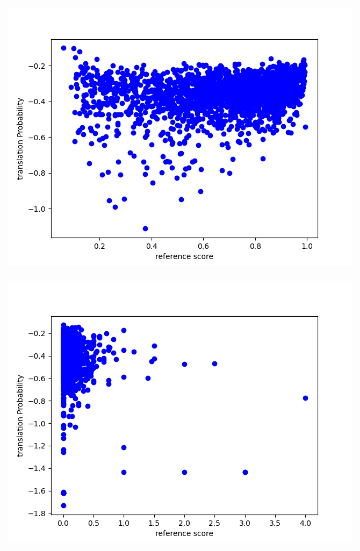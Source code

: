 \begin{figure}[ht]
    \centering%
    \begin{subfigure}{0.4\linewidth}
        \includegraphics[width=\textwidth]{Latex/sections/images/seamlessgenprob.png}
    \end{subfigure}
    \begin{subfigure}{0.4\linewidth}
        \includegraphics[width=\textwidth]{Latex/sections/images/dlmgenprob.png}
    \end{subfigure}
    \begin{subfigure}{0.4\linewidth}

\end{subfigure}
\end{figure}

